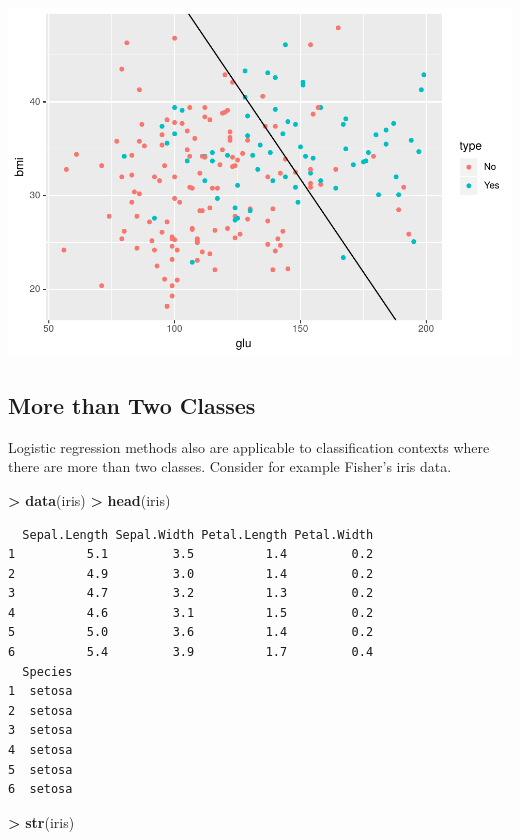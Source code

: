 \documentclass[
]{krantz}
\makeatletter
\newenvironment{Shaded}{\begin{snugshade}}{\end{snugshade}}
\newcommand{\KeywordTok}[1]{\textcolor[rgb]{0.27,0.27,0.27}{\textbf{#1}}}
\newcommand{\NormalTok}[1]{#1}
\newcommand{\OperatorTok}[1]{\textcolor[rgb]{0.43,0.43,0.43}{\textbf{#1}}}
\newcommand{\StringTok}[1]{\textcolor[rgb]{0.5,0.5,0.5}{#1}}
\newenvironment{kframe}{%
\medskip{}
\setlength{\fboxsep}{.8em}
 \def\at@end@of@kframe{}%
 \ifinner\ifhmode%
  \def\at@end@of@kframe{\end{minipage}}%
  \begin{minipage}{\columnwidth}%
 \fi\fi%
 \def\FrameCommand##1{\hskip\@totalleftmargin \hskip-\fboxsep
 \colorbox{shadecolor}{##1}\hskip-\fboxsep
     \hskip-\linewidth \hskip-\@totalleftmargin \hskip\columnwidth}%
 \MakeFramed {\advance\hsize-\width
   \@totalleftmargin\z@ \linewidth\hsize
   \@setminipage}}%
 {\par\unskip\endMakeFramed%
 \at@end@of@kframe}
\renewenvironment{Shaded}{\begin{kframe}}{\end{kframe}}
\makeatother
\begin{document}
\includegraphics{bookdown_files/figure-latex/unnamed-chunk-245-1.pdf}

\hypertarget{more-than-two-classes}{%
\subsection{More than Two Classes}\label{more-than-two-classes}}

Logistic regression methods also are applicable to classification contexts where there are more than two classes. Consider for example Fisher's iris data.

\begin{Shaded}
\begin{Highlighting}[]
\OperatorTok{\textgreater{}}\StringTok{ }\KeywordTok{data}\NormalTok{(iris)}
\OperatorTok{\textgreater{}}\StringTok{ }\KeywordTok{head}\NormalTok{(iris)}
\end{Highlighting}
\end{Shaded}

\begin{verbatim}
  Sepal.Length Sepal.Width Petal.Length Petal.Width
1          5.1         3.5          1.4         0.2
2          4.9         3.0          1.4         0.2
3          4.7         3.2          1.3         0.2
4          4.6         3.1          1.5         0.2
5          5.0         3.6          1.4         0.2
6          5.4         3.9          1.7         0.4
  Species
1  setosa
2  setosa
3  setosa
4  setosa
5  setosa
6  setosa
\end{verbatim}

\begin{Shaded}
\begin{Highlighting}[]
\OperatorTok{\textgreater{}}\StringTok{ }\KeywordTok{str}\NormalTok{(iris)}
\end{Highlighting}
\end{Shaded}
\end{document}
